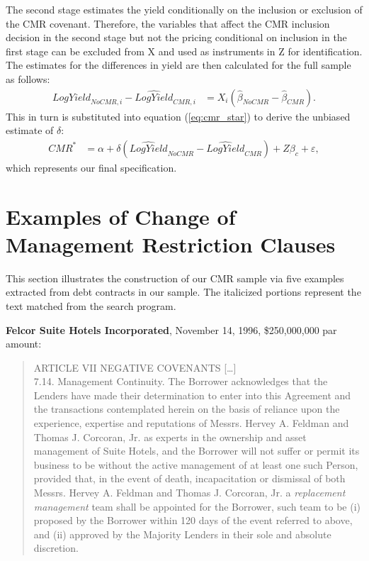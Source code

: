 \documentclass[12pt]{article}
\begin{document}
\begin{appendices}
The second stage estimates the yield conditionally on the inclusion or exclusion of the CMR covenant.
Therefore, the variables that affect the CMR inclusion decision in the second stage but not the pricing conditional on inclusion in the first stage can be excluded from X and used as instruments in Z for identification.
The estimates for the differences in yield are then calculated for the full sample as follows:%
%
\begin{align}  \label{eq:log_yield_estimate}
    \widehat{LogYield}_{NoCMR,i} - \widehat{LogYield}_{CMR,i} &= X_{i} \left( \hat{\beta}_{NoCMR} - \hat{\beta}_{CMR} \right).
\end{align}
%
This in turn is substituted into equation (\ref{eq:cmr_star}) to derive the unbiased estimate of $\delta$: %
%
\begin{align}  \label{eq:cmr_estimate}
    CMR^* &= \alpha + \delta \left(\widehat{LogYield}_{NoCMR} - \widehat{LogYield}_{CMR}\right) + Z\beta_c + \varepsilon,
\end{align}%
%
which represents our final specification.














\section{Examples of Change of Management Restriction Clauses}
 \label{IApp:cmr_examples}

This section illustrates the construction of our CMR sample via five examples extracted from debt contracts in our sample.
The italicized portions represent the text matched from the search program.

\skipline


\noindent
\textbf{Felcor Suite Hotels Incorporated}, November 14, 1996, \$250,000,000 par amount:
\begin{quote}
\singlespacing \vspace{-8pt}
ARTICLE VII NEGATIVE COVENANTS [\dots]\\
7.14. Management Continuity. The Borrower acknowledges that the Lenders have made their determination to enter into this Agreement and the transactions contemplated herein on the basis of reliance upon the experience, expertise and reputations of Messrs. Hervey A. Feldman and Thomas J. Corcoran, Jr. as experts in the ownership and asset management of Suite Hotels, and the Borrower will not suffer or permit its business to be without the active management of at least one such Person, provided that, in the event of death, incapacitation or dismissal of both Messrs. Hervey A. Feldman and Thomas J. Corcoran, Jr. a \textit{replacement management} team shall be appointed for the Borrower, such team to be (i) proposed by the Borrower within 120 days of the event referred to above, and (ii) approved by the Majority Lenders in their sole and absolute discretion.
\end{quote}


\end{appendices}
\end{document}
